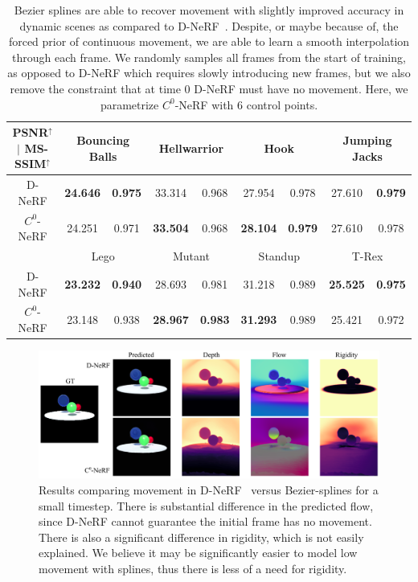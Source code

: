 \begin{table}[t]
    \centering
    \begin{tabular}{|c| c|c | c|c | c|c | c|c |}
    \hline
    \textbf{PSNR$^\uparrow$ $|$ MS-SSIM$^\uparrow$} & \multicolumn{2}{c|}{Bouncing Balls} & \multicolumn{2}{c|}{Hellwarrior} & \multicolumn{2}{c|}{Hook} & \multicolumn{2}{c|}{Jumping Jacks} \\
    \hline
    D-NeRF & \textbf{24.646} & \textbf{0.975}
           & 33.314 & 0.968
           & 27.954 & 0.978
           & 27.610 & \textbf{0.979} \\
    \hline
    $C^0$-NeRF & 24.251 & 0.971
               & \textbf{33.504} & 0.968
               & \textbf{28.104} & \textbf{0.979}
               & 27.610 & 0.978 \\
    \hline
    & \multicolumn{2}{c|}{Lego} & \multicolumn{2}{c|}{Mutant} & \multicolumn{2}{c|}{Standup} & \multicolumn{2}{c|}{T-Rex} \\
    \hline
    D-NeRF & \textbf{23.232} & \textbf{0.940}
           & 28.693 & 0.981
           & 31.218 & 0.989
           & \textbf{25.525} & \textbf{0.975} \\
    \hline
    $C^0$-NeRF & 23.148 & 0.938
               & \textbf{28.967} & \textbf{0.983}
               & \textbf{31.293} & 0.989
               & 25.421 & 0.972 \\
    \hline
    \end{tabular}
    \caption{
        Bezier splines are able to recover movement with slightly improved accuracy in dynamic scenes as compared to D-NeRF~\cite{pumarola2020dnerf}. Despite, or maybe because of, the forced prior of continuous movement, we are able to learn a smooth interpolation through each frame. We randomly samples all frames from the start of training, as opposed to D-NeRF which requires slowly introducing new frames, but we also remove the constraint that at time 0 D-NeRF must have no movement. Here, we parametrize $C^0$-NeRF with 6 control points.
    }
\end{table}

\begin{figure}
    \includegraphics[width=\textwidth]{dnerf_compare}
    \caption{
        \label{fig:dnerf_cmp}
        Results comparing movement in D-NeRF~\cite{pumarola2020dnerf} versus Bezier-splines for a small timestep. There is substantial difference in the predicted flow, since D-NeRF cannot guarantee the initial frame has no movement. There is also a significant difference in rigidity, which is not easily explained. We believe it may be significantly easier to model low movement with splines, thus there is less of a need for rigidity.
    }
\end{figure}
